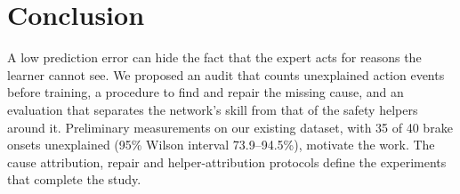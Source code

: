 \documentclass[conference]{IEEEtran}
\begin{document}
\section{Conclusion}

A low prediction error can hide the fact that the expert acts for reasons
the learner cannot see. We proposed an audit that counts unexplained
action events before training, a procedure to find and repair the missing
cause, and an evaluation that separates the network's skill from that of
the safety helpers around it. Preliminary measurements on our existing
dataset, with 35 of 40 brake onsets unexplained (95\% Wilson interval
73.9--94.5\%), motivate the work. The
cause attribution, repair and helper-attribution protocols define the
experiments that complete the study.
\end{document}
